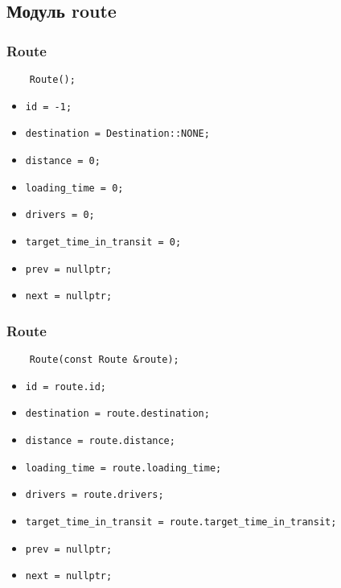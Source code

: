 \subsection{Модуль route}

\subsubsection{Route}

\begin{lstlisting}
    Route();
\end{lstlisting}

\begin{itemize}
    \item \verb|id = -1;|
    \item \verb|destination = Destination::NONE;|
    \item \verb|distance = 0;|
    \item \verb|loading_time = 0;|
    \item \verb|drivers = 0;|
    \item \verb|target_time_in_transit = 0;|
    \item \verb|prev = nullptr;|
    \item \verb|next = nullptr;|
\end{itemize}

\subsubsection{Route}

\begin{lstlisting}
    Route(const Route &route);
\end{lstlisting}

\begin{itemize}
    \item \verb|id = route.id;|
    \item \verb|destination = route.destination;|
    \item \verb|distance = route.distance;|
    \item \verb|loading_time = route.loading_time;|
    \item \verb|drivers = route.drivers;|
    \item \verb|target_time_in_transit = route.target_time_in_transit;|
    \item \verb|prev = nullptr;|
    \item \verb|next = nullptr;|
\end{itemize}


